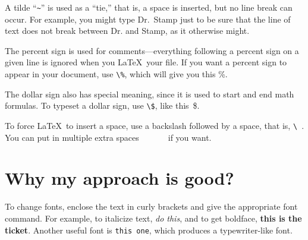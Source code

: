 A tilde ``\verb+~+'' is used as a ``tie,'' that is, a space is inserted, but no line break can occur.
For example, you might type Dr.~Stamp just to be sure that the line of text
does not break between Dr. and Stamp, as it otherwise might.

The percent sign is used for comments---everything following a percent sign 
on a given line is ignored when you \LaTeX\ your file. %
If you want a percent sign to appear in your document, use \verb+\%+, 
which will give you this \%.

The dollar sign also has special meaning, since it is used to start and end
math formulas. To typeset a dollar sign, use \verb+\$+, like this~\$.

To force \LaTeX\ to insert a space, use a backslash followed by
a space, that is, \verb+\ +. You can put in multiple extra spaces\ \ \ \ \ \ \ if you want.

\section{Why my approach is good?}

To change fonts, enclose the text in curly brackets and give the appropriate font command.
For example, to italicize text, {\it do this}, and to get boldface, {\bf this is the ticket}.
Another useful font is {\tt this one}, which produces a typewriter-like font.

